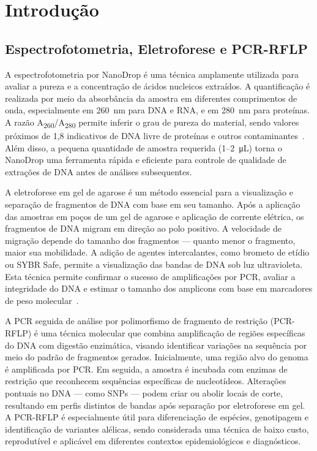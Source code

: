 \section{Introdução}

\subsection{Espectrofotometria, Eletroforese e PCR-RFLP}

A espectrofotometria por NanoDrop é uma técnica amplamente utilizada para avaliar a pureza e a 
concentração de ácidos nucleicos extraídos. A quantificação é realizada por meio da absorbância da 
amostra em diferentes comprimentos de onda, especialmente em \SI{260}{\nano\meter} para DNA e RNA, 
e em \SI{280}{\nano\meter} para proteínas. A razão A\textsubscript{260}/A\textsubscript{280} permite 
inferir o grau de pureza do material, sendo valores próximos de 1{,}8 indicativos de DNA livre de proteínas 
e outros contaminantes~\cite{Alguém}. Além disso, a pequena quantidade de amostra requerida (1–2~\si{\micro\liter}) 
torna o NanoDrop uma ferramenta rápida e eficiente para controle de qualidade de extrações de DNA antes de análises subsequentes.

A eletroforese em gel de agarose é um método essencial para a visualização e separação de fragmentos de DNA com base em seu tamanho. 
Após a aplicação das amostras em poços de um gel de agarose e aplicação de corrente elétrica, os fragmentos de DNA migram em direção 
ao polo positivo. A velocidade de migração depende do tamanho dos fragmentos — quanto menor o fragmento, maior sua mobilidade. 
A adição de agentes intercalantes, como brometo de etídio ou SYBR Safe, permite a visualização das bandas de DNA sob luz ultravioleta. 
Esta técnica permite confirmar o sucesso de amplificações por PCR, avaliar a integridade do DNA e estimar o tamanho dos amplicons 
com base em marcadores de peso molecular~\cite{Alguém}.

A PCR seguida de análise por polimorfismo de fragmento de restrição (PCR-RFLP) é uma técnica molecular que combina amplificação de regiões 
específicas do DNA com digestão enzimática, visando identificar variações na sequência por meio do padrão de fragmentos gerados. Inicialmente, 
uma região alvo do genoma é amplificada por PCR. Em seguida, a amostra é incubada com enzimas de restrição que reconhecem sequências específicas 
de nucleotídeos. Alterações pontuais no DNA — como SNPs — podem criar ou abolir locais de corte, resultando em perfis distintos de bandas após separação 
por eletroforese em gel. A PCR-RFLP é especialmente útil para diferenciação de espécies, genotipagem e identificação de variantes alélicas, sendo 
considerada uma técnica de baixo custo, reprodutível e aplicável em diferentes contextos epidemiológicos e diagnósticos.
